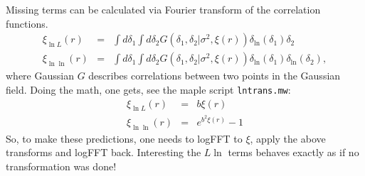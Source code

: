 \documentclass[12pt]{article}
\begin{document}
Missing terms can be calculated via Fourier transform of the
correlation functions.
\begin{eqnarray}
  \xi_{\ln L} (r) &=& \int d \delta_1 \int  d \delta_2 G(\delta_1, \delta_2|
  \sigma^2, \xi(r)) \delta_{\ln}(\delta_1) \delta_2\\
  \xi_{\ln \ln} (r) &=& \int d \delta_1 \int  d \delta_2 G(\delta_1, \delta_2|
  \sigma^2, \xi(r)) \delta_{\ln}(\delta_1) \delta_{\ln}(\delta_2),
\end{eqnarray}
where Gaussian $G$ describes correlations between two points in the
Gaussian field.
Doing the math, one gets, see the maple script \texttt{lntrans.mw}:
\begin{eqnarray}
  \xi_{\ln L} (r) &=& b\xi(r)\\
  \xi_{\ln \ln} (r) &=& e^{b^2 \xi(r)}-1
\end{eqnarray}
So, to make these predictions, one needs to logFFT to $\xi$, apply the
above transforms and logFFT back. Interesting the $L \ln$ terms
behaves exactly as if no transformation was done!
\end{document}
